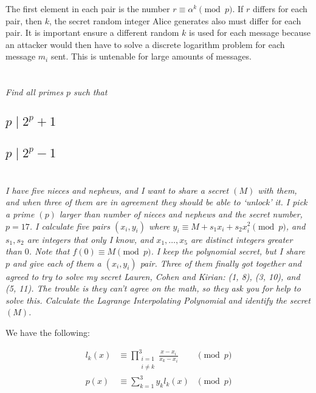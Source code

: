 \documentclass[12pt]{article}
\begin{document}
    The first element in each pair is the number $r \equiv \alpha^k \pmod{p}$. If $r$ differs for each pair, then $k$, the secret random integer Alice generates also must differ for each pair. It is important ensure a different random $k$ is used for each message because an attacker would then have to solve a discrete logarithm problem for each message $m_i$ sent. This is untenable for large amounts of messages.

\newpage

\section{} \textit{Find all primes $p$ such that}

    \subsection{$p \mid 2^p + 1$}

    \subsection{$p \mid 2^p - 1$}

\newpage

\section{} \textit{I have five nieces and nephews, and I want to share a secret $(M)$ with them, and when three of them are in agreement they should be able to `unlock' it. I pick a prime $(p)$ larger than number of nieces and nephews and the secret number, $p = 17$. I calculate five pairs $(x_i, y_i)$ where $y_i \equiv M + s_1 x_i + s_2 x_i ^ 2\pmod{p}$, and $s_1, s_2$ are integers that only I know, and $x_1, \dots, x_5$ are distinct integers greater than $0$. Note that $f(0) \equiv M \pmod{p}$. I keep the polynomial secret, but I share $p$ and give each of them a $(x_i, y_i)$ pair. Three of them finally got together and agreed to try to solve my secret Lauren, Cohen and Kirian: (1, 8), (3, 10), and (5, 11). The trouble is they can't agree on the math, so they ask you for help to solve this. Calculate the Lagrange Interpolating Polynomial and identify the secret $(M)$.}

    We have the following:

    \begin{align*}
        l_k(x) &\equiv \prod_{\substack{i = 1 \\ i \neq k}}^3 \frac{x - x_i}{x_k - x_i} &\pmod{p}\\
        p(x) &\equiv \sum_{k = 1}^3 y_k l_k(x) &\pmod{p}
    \end{align*}
\end{document}
